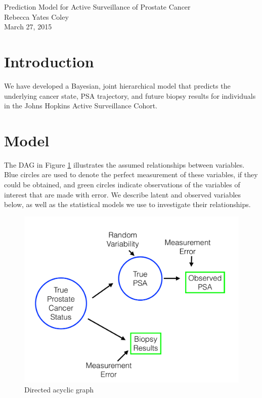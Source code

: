\documentclass[12pt, letterpaper]{article}
\begin{document}
\begin{center}
\large Prediction Model for Active Surveillance of Prostate Cancer\\
Rebecca Yates Coley\\
March 27, 2015\\
\end{center}

\section{Introduction }

We have developed a Bayesian, joint hierarchical model that predicts the underlying cancer state, PSA trajectory, and future biopsy results for individuals in the Johns Hopkins Active Surveillance Cohort. 

\section{Model}



The DAG in Figure \ref{fig:pred-dag} illustrates the assumed relationships between variables. Blue circles are used to denote the perfect measurement of these variables, if they could be obtained, and green circles indicate observations of the variables of interest that are made with error. We describe latent and observed variables below, as well as the statistical models we use to investigate their relationships.

\begin{figure}[b*]
\includegraphics[scale=0.5]{pred-dag}
\caption{Directed acyclic graph}
\label{fig:pred-dag}
\end{figure}
\end{document}
